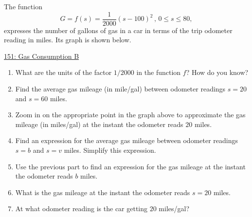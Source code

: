 \documentclass{ximera}
\begin{document}
\begin{question} \label{Q:987GHEjerf}
The function
\[
    G = f(s) = \frac{1}{2000}(s-100)^2 \, , \, 0\leq s \leq 80,
\]
expresses the number of gallons of gas in a car in terms of the trip odometer reading in miles. Its graph is shown below.

\begin{onlineOnly}
    \begin{center}
\end{center}
\end{onlineOnly}

\href{https://www.desmos.com/calculator/igubjr4nw1}{151: Gas Consumption B}

\begin{enumerate}
\item What are the units of the factor $1/2000$ in the function $f$? How do you know?

\item Find the average gas mileage (in mile/gal) between odometer readings $s=20$ and $s=60$ miles.

\item Zoom in on the appropriate point in the graph above to approximate the gas mileage (in miles/gal) at the instant the odometer reads $20$ miles.

\item Find an expression for the average gas mileage between odometer readings $s=b$ and $s=v$ miles. Simplify this expression.

\item Use the previous part to find an expression for the gas mileage at the instant the odometer reads $b$ miles.

\item What is the gas mileage at the instant the odometer reads $s=20$ miles.

\item At what odometer reading is the car getting $20$ miles/gal?

\end{enumerate}

\end{question}
\end{document}
